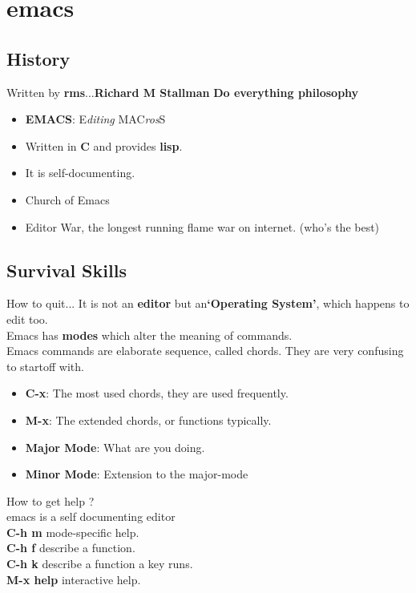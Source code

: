 \documentclass{beamer}
\begin{document}
\section{emacs}

\subsection{History}
\begin{frame}{Written by \textbf{rms}...}{\textbf{Richard M Stallman}}
	\textbf{Do everything philosophy} \\
	\pause
	\begin{itemize}
		\item {
				\textbf{EMACS}: \alert{E}\textit{diting} \alert{MAC}\textit{ros}\alert{S}
				\pause

			}
		\item {
				Written in \textbf{C} and provides \textbf{lisp}.
				\pause

			}
		\item {
				It is self-documenting.
				\pause
			}
		\item {
				Church of Emacs
				\pause
			}
		\item {
				Editor War, the longest running flame war on internet. (who's the best)

			}
	\end{itemize}
\end{frame}

\subsection{Survival Skills}
\begin{frame}{How to quit...}
	It is not an \textbf{editor} but an\textbf{`Operating System'}, which happens to edit too.\\
	Emacs has \textbf{modes} which alter the meaning of commands. \\
	Emacs commands are elaborate sequence, called \alert{chords}. They are very confusing to startoff with.
	\begin{itemize}
		\item {
			\textbf{C-x}: The most used chords, they are used frequently.
			\pause
			}

		\item {   
			\textbf{M-x}: The extended chords, or functions typically.
			\pause

			}
		\item {
			\textbf{Major Mode}: What are you doing.
			\pause
			}
		\item {
			\textbf{Minor Mode}: Extension to the major-mode
			\pause
			}
	\end{itemize}
	How to get \alert{help }?\\ \pause
	emacs is a self documenting editor\\
	\textbf{C-h m} mode-specific help.\\
	\textbf{C-h f} describe a function.\\
	\textbf{C-h k} describe a function a key runs.\\
	\textbf{M-x help} interactive help.\\

\end{frame}
\end{document}
